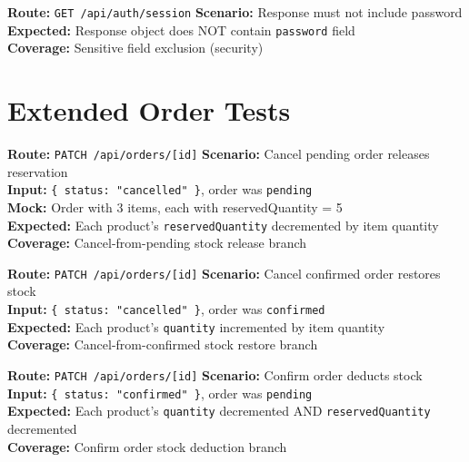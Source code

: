 ﻿\documentclass[12pt,a4paper]{report}
\newcommand{\pone}{\textbf{\color{p1red}P1}}
\newcommand{\ptwo}{\textbf{\color{p2orange}P2}}
\begin{document}
\begin{tcolorbox}[criticalbox,title={AUTH-020 \hfill \pone\ --- Password Not Exposed}]
\textbf{Route:} \texttt{GET /api/auth/session} \quad \textbf{Scenario:} Response must not include password \\
\textbf{Expected:} Response object does NOT contain \texttt{password} field \\
\textbf{Coverage:} Sensitive field exclusion (security)
\end{tcolorbox}

\section{Extended Order Tests}

\begin{tcolorbox}[testbox,title={ORD-017 \hfill \ptwo}]
\textbf{Route:} \texttt{PATCH /api/orders/[id]} \quad \textbf{Scenario:} Cancel pending order releases reservation \\
\textbf{Input:} \texttt{\{ status: "cancelled" \}}, order was \texttt{pending} \\
\textbf{Mock:} Order with 3 items, each with reservedQuantity = 5 \\
\textbf{Expected:} Each product's \texttt{reservedQuantity} decremented by item quantity \\
\textbf{Coverage:} Cancel-from-pending stock release branch
\end{tcolorbox}

\begin{tcolorbox}[testbox,title={ORD-018 \hfill \ptwo}]
\textbf{Route:} \texttt{PATCH /api/orders/[id]} \quad \textbf{Scenario:} Cancel confirmed order restores stock \\
\textbf{Input:} \texttt{\{ status: "cancelled" \}}, order was \texttt{confirmed} \\
\textbf{Expected:} Each product's \texttt{quantity} incremented by item quantity \\
\textbf{Coverage:} Cancel-from-confirmed stock restore branch
\end{tcolorbox}

\begin{tcolorbox}[testbox,title={ORD-019 \hfill \ptwo}]
\textbf{Route:} \texttt{PATCH /api/orders/[id]} \quad \textbf{Scenario:} Confirm order deducts stock \\
\textbf{Input:} \texttt{\{ status: "confirmed" \}}, order was \texttt{pending} \\
\textbf{Expected:} Each product's \texttt{quantity} decremented AND \texttt{reservedQuantity} decremented \\
\textbf{Coverage:} Confirm order stock deduction branch
\end{tcolorbox}
\end{document}
